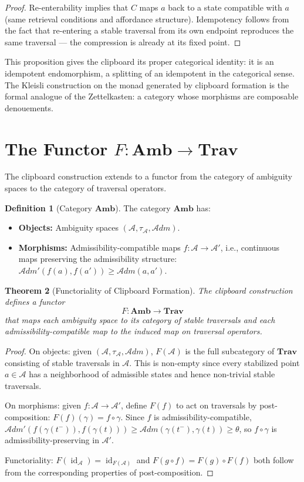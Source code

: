 \documentclass[12pt,oneside]{book}
\theoremstyle{plain}
\newtheorem{theorem}{Theorem}[chapter]
\theoremstyle{definition}
\newtheorem{definition}[theorem]{Definition}
\theoremstyle{plain}
\DeclareMathOperator{\id}{id}
\newcommand{\Trav}{\mathbf{Trav}}
\newcommand{\Amb}{\mathbf{Amb}}
\newcommand{\cA}{\mathcal{A}}
\begin{document}
\begin{proof}
Re-enterability implies that $C$ maps $a$ back to a state compatible with $a$ (same retrieval conditions and affordance structure). Idempotency follows from the fact that re-entering a stable traversal from its own endpoint reproduces the same traversal — the compression is already at its fixed point.
\end{proof}

This proposition gives the clipboard its proper categorical identity: it is an idempotent endomorphism, a splitting of an idempotent in the categorical sense. The Kleisli construction on the monad generated by clipboard formation is the formal analogue of the Zettelkasten: a category whose morphisms are composable denouements.

\section{The Functor \texorpdfstring{$F : \Amb \to \Trav$}{F: Amb -> Trav}}

The clipboard construction extends to a functor from the category of ambiguity spaces to the category of traversal operators.

\begin{definition}[Category $\Amb$]
The category $\Amb$ has:
\begin{itemize}[noitemsep]
\item \textbf{Objects:} Ambiguity spaces $(\cA, \tau_\cA, \mathcal{A}dm)$.
\item \textbf{Morphisms:} Admissibility-compatible maps $f : \cA \to \cA'$, i.e., continuous maps preserving the admissibility structure: $\mathcal{A}dm'(f(a), f(a')) \geq \mathcal{A}dm(a, a')$.
\end{itemize}
\end{definition}

\begin{theorem}[Functoriality of Clipboard Formation]
The clipboard construction defines a functor
\[
F : \Amb \to \Trav
\]
that maps each ambiguity space to its category of stable traversals and each admissibility-compatible map to the induced map on traversal operators.
\end{theorem}

\begin{proof}
On objects: given $(\cA, \tau_\cA, \mathcal{A}dm)$, $F(\cA)$ is the full subcategory of $\Trav$ consisting of stable traversals in $\cA$. This is non-empty since every stabilized point $a \in \cA$ has a neighborhood of admissible states and hence non-trivial stable traversals.

On morphisms: given $f : \cA \to \cA'$, define $F(f)$ to act on traversals by post-composition: $F(f)(\gamma) = f \circ \gamma$. Since $f$ is admissibility-compatible, $\mathcal{A}dm'(f(\gamma(t^-)), f(\gamma(t))) \geq \mathcal{A}dm(\gamma(t^-), \gamma(t)) \geq \theta$, so $f \circ \gamma$ is admissibility-preserving in $\cA'$.

Functoriality: $F(\id_\cA) = \id_{F(\cA)}$ and $F(g \circ f) = F(g) \circ F(f)$ both follow from the corresponding properties of post-composition.
\end{proof}
\end{document}
